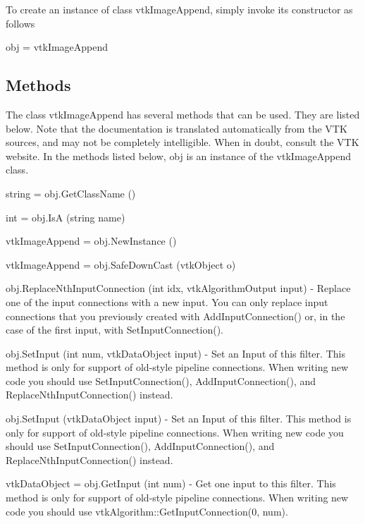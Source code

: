 To create an instance of class vtk\-Image\-Append, simply invoke its constructor as follows \begin{DoxyVerb}  obj = vtkImageAppend
\end{DoxyVerb}
 \hypertarget{vtkwidgets_vtkxyplotwidget_Methods}{}\subsection{Methods}\label{vtkwidgets_vtkxyplotwidget_Methods}
The class vtk\-Image\-Append has several methods that can be used. They are listed below. Note that the documentation is translated automatically from the V\-T\-K sources, and may not be completely intelligible. When in doubt, consult the V\-T\-K website. In the methods listed below, {\ttfamily obj} is an instance of the vtk\-Image\-Append class. 
\begin{DoxyItemize}
\item {\ttfamily string = obj.\-Get\-Class\-Name ()}  
\item {\ttfamily int = obj.\-Is\-A (string name)}  
\item {\ttfamily vtk\-Image\-Append = obj.\-New\-Instance ()}  
\item {\ttfamily vtk\-Image\-Append = obj.\-Safe\-Down\-Cast (vtk\-Object o)}  
\item {\ttfamily obj.\-Replace\-Nth\-Input\-Connection (int idx, vtk\-Algorithm\-Output input)} -\/ Replace one of the input connections with a new input. You can only replace input connections that you previously created with Add\-Input\-Connection() or, in the case of the first input, with Set\-Input\-Connection().  
\item {\ttfamily obj.\-Set\-Input (int num, vtk\-Data\-Object input)} -\/ Set an Input of this filter. This method is only for support of old-\/style pipeline connections. When writing new code you should use Set\-Input\-Connection(), Add\-Input\-Connection(), and Replace\-Nth\-Input\-Connection() instead.  
\item {\ttfamily obj.\-Set\-Input (vtk\-Data\-Object input)} -\/ Set an Input of this filter. This method is only for support of old-\/style pipeline connections. When writing new code you should use Set\-Input\-Connection(), Add\-Input\-Connection(), and Replace\-Nth\-Input\-Connection() instead.  
\item {\ttfamily vtk\-Data\-Object = obj.\-Get\-Input (int num)} -\/ Get one input to this filter. This method is only for support of old-\/style pipeline connections. When writing new code you should use vtk\-Algorithm\-::\-Get\-Input\-Connection(0, num).  

\end{DoxyItemize}
